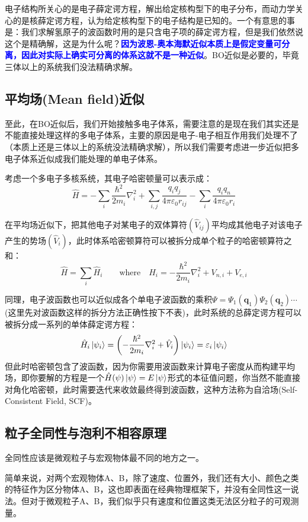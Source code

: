 电子结构所关心的是电子薛定谔方程，解出给定核构型下的电子分布，而动力学关心的是核薛定谔方程，认为给定核构型下的电子结构是已知的。一个有意思的事是：我们求解氢原子的波函数时用的是只含电子项的薛定谔方程，但是我们依然说这个是精确解，这是为什么呢？\textcolor{blue}{\textbf{因为波恩-奥本海默近似本质上是假定变量可分离，因此对实际上确实可分离的体系这就不是一种近似}}。BO近似是必要的，毕竟三体以上的系统我们没法精确求解。

\subsection{平均场(Mean field)近似}
至此，在BO近似后，我们开始接触多电子体系，需要注意的是现在我们其实还是不能直接处理这样的多电子体系，主要的原因是电子-电子相互作用我们处理不了（本质上还是三体以上的系统没法精确求解），所以我们需要考虑进一步近似把多电子体系近似成我们能处理的单电子体系。

考虑一个多电子多核系统，其电子哈密顿量可以表示成：
\[\hat{H}=-\sum_{i}\frac{\hbar^2}{2m_i}\nabla^2_i+\sum_{i,j}\frac{q_iq_j}{4 \pi \varepsilon_0 r_{ij}}-\sum_i\frac{q_iq_n}{4 \pi \varepsilon_0 r_{i}}\]

在平均场近似下，把其他电子对某电子的双体算符$(\hat{V}_{ij})$平均成其他电子对该电子产生的势场$(\hat{V}_{i})$，此时体系哈密顿算符可以被拆分成单个粒子的哈密顿算符之和：
\[\hat{H}=\sum_{i}\hat{H}_{i} \qquad \text{where} \quad \hat{H}_i=-\frac{\hbar^2}{2m_i}\nabla^2_i+V_{n,i}+V_{e,i}\]

同理，电子波函数也可以近似成各个单电子波函数的乘积$\varPsi=\varPsi_1(\bm{q}_1)\varPsi_2(\bm{q}_2)\cdots$(这里先对波函数这样的拆分方法正确性按下不表)，此时系统的总薛定谔方程可以被拆分成一系列的单体薛定谔方程：
\[\hat{H}_i\ket{\psi_i}=\left( -\frac{\hbar^2}{2m_i}\nabla^2_i+\hat{V}_i \right)\ket{\psi_i}=\varepsilon_i\ket{\psi_i}\]
但此时哈密顿包含了波函数，因为你需要用波函数来计算电子密度从而构建平均场，即你要解的方程是一个$\hat{H}(\psi)\ket{\psi}=E\ket{\psi}$形式的本征值问题，你当然不能直接对角化哈密顿，此时需要迭代来收敛最终得到波函数，这种方法称为自洽场(Self-Consistent Field, SCF)。
\subsection{粒子全同性与泡利不相容原理}
全同性应该是微观粒子与宏观物体最不同的地方之一。

简单来说，对两个宏观物体A、B，除了速度、位置外，我们还有大小、颜色之类的特征作为区分物体A、B，这也即表面在经典物理框架下，并没有全同性这一说法。但对于微观粒子A、B，我们似乎只有速度和位置这类无法区分粒子的可观测量。

